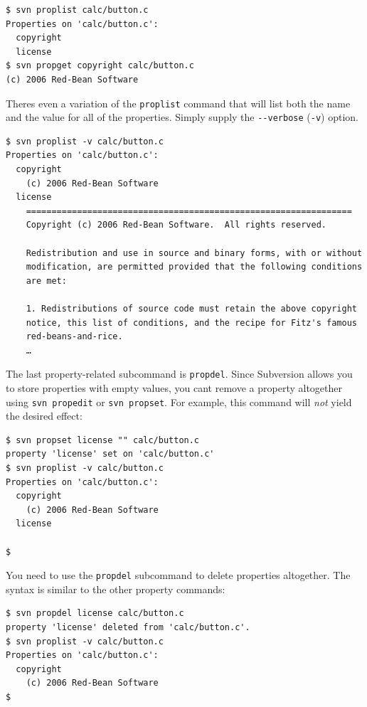 \begin{verbatim}
$ svn proplist calc/button.c
Properties on 'calc/button.c':
  copyright
  license
$ svn propget copyright calc/button.c
(c) 2006 Red-Bean Software
\end{verbatim}

There\textquotesingle s even a variation of the \texttt{proplist}
command that will list both the name and the value for all of the
properties. Simply supply the \texttt{-\/-verbose} (\texttt{-v}) option.

\begin{verbatim}
$ svn proplist -v calc/button.c
Properties on 'calc/button.c':
  copyright
    (c) 2006 Red-Bean Software
  license
    ================================================================
    Copyright (c) 2006 Red-Bean Software.  All rights reserved.

    Redistribution and use in source and binary forms, with or without
    modification, are permitted provided that the following conditions 
    are met:

    1. Redistributions of source code must retain the above copyright
    notice, this list of conditions, and the recipe for Fitz's famous
    red-beans-and-rice.
    …
\end{verbatim}

The last property-related subcommand is \texttt{propdel}. Since
Subversion allows you to store properties with empty values, you
can\textquotesingle t remove a property altogether using
\texttt{svn\ propedit} or \texttt{svn\ propset}. For example, this
command will \emph{not} yield the desired effect:

\begin{verbatim}
$ svn propset license "" calc/button.c
property 'license' set on 'calc/button.c'
$ svn proplist -v calc/button.c
Properties on 'calc/button.c':
  copyright
    (c) 2006 Red-Bean Software
  license
    
$
\end{verbatim}

You need to use the \texttt{propdel} subcommand to delete properties
altogether. The syntax is similar to the other property commands:

\begin{verbatim}
$ svn propdel license calc/button.c
property 'license' deleted from 'calc/button.c'.
$ svn proplist -v calc/button.c
Properties on 'calc/button.c':
  copyright
    (c) 2006 Red-Bean Software
$
\end{verbatim}

